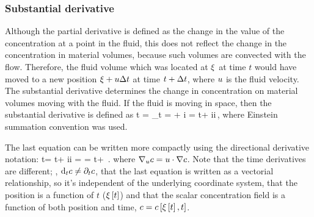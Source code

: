 \subsubsection{Substantial derivative}
Although the partial derivative is defined as the change in the value of the concentration at a point in the fluid, this does not reflect the change in the concentration in material volumes, because such volumes are convected with the flow. Therefore, the fluid volume which was located at $\xi$ at time $t$ would have moved to a new position $\xi + u\Delta t$ at time $t + \Delta t$, where $u$ is the fluid velocity. The substantial derivative determines the change in concentration on material volumes moving with the fluid. If the fluid is moving in space, then the substantial derivative is defined as
\beq
\xod\conc t = \lim_{\Dx t}
            =  + \fvec\vel i
            = \ipd t\conc + \fvec\vel i\ipd i\conc\,,
\eeq
where Einstein summation convention was used.

The last equation can be written more compactly using the directional derivative notation:
\beq
\iod t\conc = \ipd t\conc + \fvec\vel i\ipd i\conc
            = \vel\iprod\gder\conc
            = \ipd t\conc + \dirdev\vel\conc\,.
\eeq
where $\nabla_{u}{c} = u\cdot\nabla c$. Note that the time derivatives are different; \ie, $\text{d}_{t}c \not =\partial_{t}c$, that the last equation is written as a vectorial relationship, so it's independent of the underlying coordinate system, that the position is a function of $t$ ($\xi\left[{t}\right]$) and that the scalar concentration field is a function of both position and time, $c = c\left[{\xi\left[{t}\right], t}\right]$.


